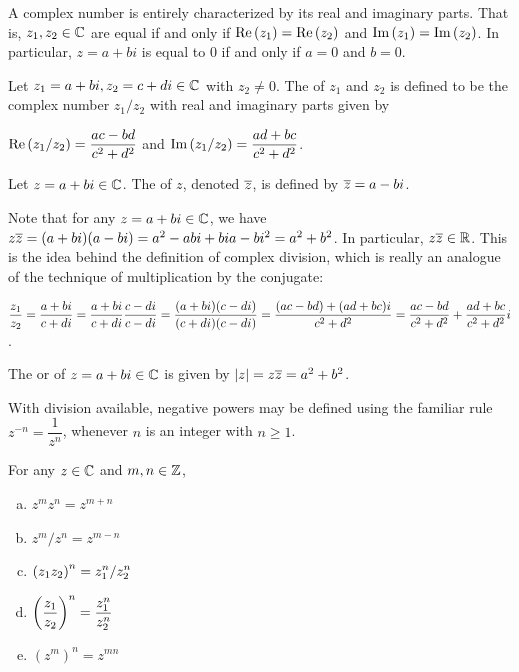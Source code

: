 \documentclass[11pt,fleqn,dvipsnames,usenames]{article}
\newcommand{\p}{\noindent}
\begin{document}
\note A complex number is entirely characterized by its real and imaginary parts.  That is, $z_{1},z_{2}\in\mathbb{C}$ are equal if and only if $\text{Re}\left(z_{1}\right) = \text{Re}\left(z_{2}\right)$ and $\text{Im}\left(z_{1}\right) = \text{Im}\left(z_{2}\right)$.  In particular, $z = a + bi$ is equal to $0$ if and only if $a = 0$ and $b = 0$.

\begin{definition}
Let $z_{1} = a+bi,z_{2} = c+di\in\mathbb{C}$ with $z_{2}\neq 0$.  The  of $z_{1}$ and $z_{2}$ is defined to be the complex number $z_{1}/z_{2}$ with real and imaginary parts given by
\begin{center}
$\text{Re}\left(z_{1}/z_{2}\right) = \dfrac{ac - bd}{c^2 + d^2}$ and $\text{Im}\left(z_{1}/z_{2}\right) = \dfrac{ad + bc}{c^2 + d^2}$.
\end{center}
\end{definition}

\begin{definition}
Let $z = a + bi\in\mathbb{C}$.  The  of $z$, denoted $\overline{z}$, is defined by $\overline{z} = a - bi$.
\end{definition}
\vsp

\p Note that for any $z = a + bi\in\mathbb{C}$, we have $z\overline{z} = (a + bi)(a - bi) = a^2 - abi + bia - bi^2 = a^2 + b^2$.  In particular, $z\overline{z}\in\mathbb{R}$.  This is the idea behind the definition of complex division, which is really an analogue of the technique of {multiplication by the conjugate}:

\begin{center}
$\displaystyle{\frac{z_{1}}{z_{2}} = \frac{a + bi}{c + di} = \frac{a + bi}{c + di}\frac{c - di}{c - di} = \frac{(a + bi)(c - di)}{(c + di)(c - di)} = \frac{(ac - bd) + (ad + bc)i}{c^2 + d^2} = \frac{ac - bd}{c^2 + d^2} + \frac{ad + bc}{c^2 + d^2}i}$.
\end{center}

\begin{definition}
The  or  of $z = a+bi\in\mathbb{C}$ is given by $|z| = z\overline{z} = a^2 + b^2$.
\end{definition}

\p With division available, negative powers may be defined using the familiar rule $z^{-n} = \dfrac{1}{z^{n}}$, whenever $n$ is an integer with $n\geq 1$.
\vsp

\properties For any $z\in\mathbb{C}$ and $m,n\in\mathbb{Z}$,
\begin{enumerate}[(a)]
\item $z^{m}z^{n} = z^{m+n}$
\item $z^{m}/z^{n} = z^{m-n}$
\item $\displaystyle{\left(z_{1}z_{2}\right)^{n} = z_{1}^{n}/z_{2}^{n}}$
\item $\displaystyle{\left(\frac{z_{1}}{z_{2}}\right)^{n} = \frac{z_{1}^{n}}{z_{2}^{n}}}$
\item $\left(z^{m}\right)^{n} = z^{mn}$
\end{enumerate}
\vsp
\end{document}
